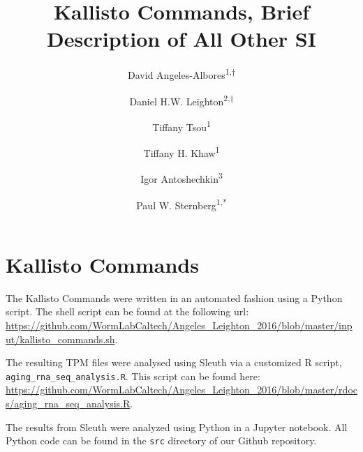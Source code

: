 \documentclass{article}
\title{Kallisto Commands, Brief Description of All Other SI}
\author{David Angeles-Albores\textsuperscript{1,$\dagger{}$}
\and{}
Daniel H.W. Leighton\textsuperscript{2,$\dagger{}$}
\and{}
Tiffany Tsou\textsuperscript{1}
\and{}
Tiffany H. Khaw\textsuperscript{1}
\and{}
Igor Antoshechkin\textsuperscript{3}
\and{}
Paul W. Sternberg\textsuperscript{1,*}
}
\begin{document}
 \maketitle
 \tableofcontents

 \section{Kallisto Commands}

 The Kallisto Commands were written in an automated fashion using a Python script. The shell script can be found at the following url: \url{https://github.com/WormLabCaltech/Angeles_Leighton_2016/blob/master/input/kallisto_commands.sh}.

 The resulting TPM files were analysed using Sleuth via a customized R script, \texttt{aging\_rna\_seq\_analysis.R}. This script can be found here: \url{https://github.com/WormLabCaltech/Angeles_Leighton_2016/blob/master/rdocs/aging_rna_seq_analysis.R}.

 The results from Sleuth were analyzed using Python in a Jupyter notebook. All Python code can be found in the \texttt{src} directory of our Github repository.
\end{document}
